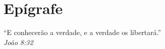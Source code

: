 \chapter*{Epígrafe}
\begin{flushright}
``E conhecerão a verdade, e a verdade os libertará.''\\
\textit{João 8:32}
\end{flushright}
